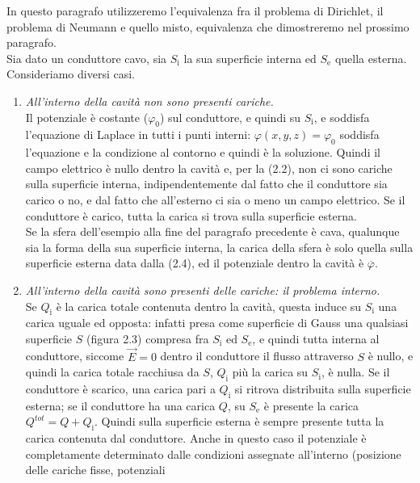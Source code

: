 In questo paragrafo utilizzeremo l'equivalenza fra il problema di Dirichlet, il
problema di Neumann e quello misto, equivalenza che dimostreremo nel prossimo
paragrafo.\\
Sia dato un conduttore cavo, sia $S_\mathrm{i}$ la sua superficie interna ed
$S_\mathrm{e}$ quella esterna. Consideriamo diversi casi.
\begin{enumerate}
  \item \emph{All'interno della cavit\`a non sono presenti cariche.}\\
    Il potenziale \`e costante ($\varphi_0$) sul conduttore, e quindi su
    $S_\mathrm{i}$, e soddisfa l'equazione di Laplace in tutti i punti interni:
    $\varphi(x,y,z)=\varphi_0$ soddisfa l'equazione e la condizione al contorno
    e quindi \`e la soluzione. Quindi il campo elettrico \`e nullo dentro la
    cavit\`a e, per la (2.2), non ci sono cariche sulla superficie interna,
    indipendentemente dal fatto che il conduttore sia carico o no, e dal fatto
    che all'esterno ci sia o meno un campo elettrico. Se il conduttore \`e
    carico, tutta la carica si trova sulla superficie esterna.\\
    Se la sfera dell'esempio alla fine del paragrafo precedente \`e cava,
    qualunque sia la forma della sua superficie interna, la carica della sfera
    \`e solo quella sulla superficie esterna data dalla (2.4), ed il potenziale
    dentro la cavit\`a \`e $\overline\varphi$.
  \item \emph{All'interno della cavit\`a sono presenti delle cariche: il
    problema interno.}\\
    Se $Q_\mathrm{i}$ \`e la carica totale contenuta dentro la cavit\`a, questa
    induce su $S_\mathrm{i}$ una carica uguale ed opposta: infatti presa come
    superficie di Gauss una qualsiasi superficie $S$ (figura 2.3) compresa fra
    $S_\mathrm{i}$ ed $S_\mathrm{e}$, e quindi tutta interna al conduttore,
    siccome $\vec E=0$ dentro il conduttore il flusso attraverso $S$ \`e nullo,
    e quindi la carica totale racchiusa da $S$, $Q_\mathrm{i}$ pi\`u la carica
    su $S_\mathrm{i}$, \`e nulla. Se il conduttore \`e scarico, una carica pari
    a $Q_\mathrm{i}$ si ritrova distribuita sulla superficie esterna; se il
    conduttore ha una carica $Q$, su $S_\mathrm{e}$ \`e presente la carica
    $Q^{tot}=Q+Q_\mathrm{i}$. Quindi sulla superficie esterna \`e sempre
    presente tutta la carica contenuta dal conduttore.
    Anche in questo caso il potenziale \`e completamente determinato dalle
    condizioni assegnate all'interno (posizione delle cariche fisse, potenziali

\end{enumerate}
